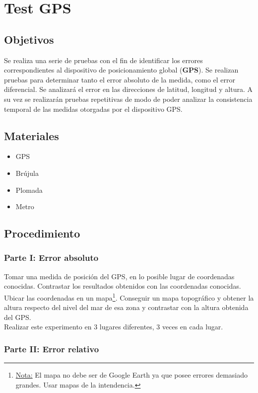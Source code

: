 \documentclass[spanish,12pt,a4paper,titlepage]{report}
\begin{document}
\chapter{Test GPS}

\section{Objetivos}

Se realiza una serie de pruebas con el fin de identificar los errores correspondientes al dispositivo de posicionamiento global (\textbf{GPS}). Se realizan pruebas para determinar tanto el error absoluto de la medida, como el error diferencial. Se analizará el error en las direcciones de latitud, longitud y altura. A su vez se realizarán pruebas repetitivas de modo de poder analizar la consistencia temporal de las medidas otorgadas por el dispositivo GPS.

\section{Materiales}
\begin{itemize}
\item GPS
\item Brújula
\item Plomada
\item Metro
\end{itemize}
\section{Procedimiento}

\subsection{Parte I: Error absoluto}
Tomar una medida de posición del GPS, en lo posible lugar de coordenadas conocidas. Contrastar los resultados obtenidos con las coordenadas conocidas. Ubicar las coordenadas en un mapa\footnote{\underline{Nota:} El mapa no debe ser de Google Earth ya que posee errores demasiado grandes. Usar mapas de la intendencia.}. Conseguir un mapa topográfico y obtener la altura respecto del nivel del mar de esa zona y contrastar con la altura obtenida del GPS. \\

Realizar este experimento en 3 lugares diferentes, 3 veces en cada lugar.

\subsection{Parte II: Error relativo}
\end{document}
